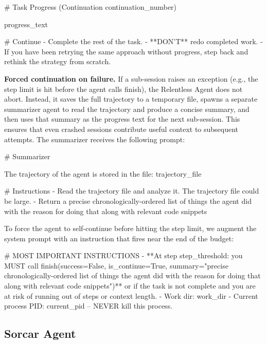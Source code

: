 \documentclass{article}
\begin{document}
\begin{prompt}
# Task Progress (Continuation {continuation_number})

{progress_text}

# Continue
- Complete the rest of the task.
- **DON'T** redo completed work.
- If you have been retrying the same approach without progress,
  step back and rethink the strategy from scratch.
\end{prompt}

\textbf{Forced continuation on failure.}  If a sub-session raises an exception (e.g., the step limit is hit before the agent calls finish), the Relentless Agent does not abort.  Instead, it saves the full trajectory to a temporary file, spawns a separate summarizer agent to read the trajectory and produce a concise summary, and then uses that summary as the progress text for the next sub-session.  This ensures that even crashed sessions contribute useful context to subsequent attempts.  The summarizer receives the following prompt:

\begin{prompt}
# Summarizer

The trajectory of the agent is stored in the file: {trajectory_file}

# Instructions
- Read the trajectory file and analyze it.  The trajectory file
  could be large.
- Return a precise chronologically-ordered list of things the
  agent did with the reason for doing that along with relevant
  code snippets
\end{prompt}

\noindent To force the agent to self-continue before hitting the step limit, we augment the system prompt with an instruction that fires near the end of the budget:

\begin{prompt}
# MOST IMPORTANT INSTRUCTIONS
- **At step {step_threshold}: you MUST call
  finish(success=False, is_continue=True,
  summary="precise chronologically-ordered list of things
  the agent did with the reason for doing that along with
  relevant code snippets")** or if the task is not complete
  and you are at risk of running out of steps or context
  length.
- Work dir: {work_dir}
- Current process PID: {current_pid} -- NEVER kill this
  process.
\end{prompt}

\subsection{Sorcar Agent}
\label{sec:sorcar-agent}
\end{document}
